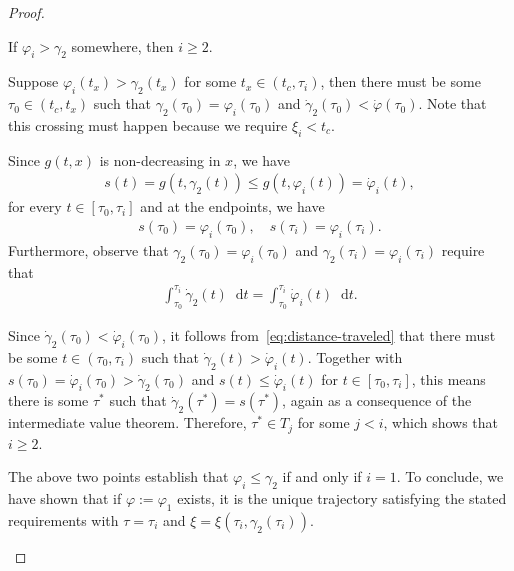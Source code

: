 \documentclass[a4paper]{article}
\theoremstyle{definition}
\theoremstyle{plain}
\newcommand*\diff{\mathop{}\!\mathrm{d}}
\begin{document}
\begin{proof}
\begin{outline}
  \1 If $\varphi_{i} > \gamma_{2}$ somewhere, then $i \geq 2$.

  \2 Suppose $\varphi_{i}(t_{x}) > \gamma_{2}(t_{x})$ for some
  $t_{x} \in (t_{c}, \tau_{i})$, then there must be some
  $\tau_{0} \in (t_{c}, t_{x})$ such that
  $\gamma_{2}(\tau_{0}) = \varphi_{i}(\tau_{0})$ and
  $\dot{\gamma}_{2}(\tau_{0}) < \dot{\varphi}(\tau_{0})$. Note that this
  crossing must happen because we require $\xi_{i} < t_{c}$.

  \2 Since $g(t, x)$ is non-decreasing in $x$, we have
  \begin{align}
    s(t) = g(t, \gamma_{2}(t)) \leq g(t, \varphi_{i}(t)) = \dot{\varphi}_{i}(t) ,
  \end{align}
  for every $t \in [\tau_{0}, \tau_{i}]$ and at the endpoints, we have
  \begin{align}
    s(\tau_{0}) = \varphi_{i}(\tau_{0}), \quad s(\tau_{i}) = \varphi_{i}(\tau_{i}) .
  \end{align}
  Furthermore, observe that $\gamma_{2}(\tau_{0}) = \varphi_{i}(\tau_{0})$ and
  $\gamma_{2}(\tau_{i}) = \varphi_{i}(\tau_{i})$ require that
  \begin{align}\label{eq:distance-traveled}
    \int_{\tau_{0}}^{\tau_{i}} \dot{\gamma}_{2}(t) \diff t  = \int_{\tau_{0}}^{\tau_{i}} \dot{\varphi}_{i}(t) \diff t .
  \end{align}

  \2 Since $\dot{\gamma}_{2}(\tau_{0}) < \dot{\varphi}_{i}(\tau_{0})$, it follows
  from~\eqref{eq:distance-traveled} that there must be some $t \in (\tau_{0}, \tau_{i})$
  such that $\dot{\gamma}_{2}(t) > \dot{\varphi}_{i}(t)$.
  Together with $s(\tau_{0}) = \dot{\varphi}_{i}(\tau_{0}) > \dot{\gamma}_{2}(\tau_{0})$
  and $s(t) \leq \dot{\varphi}_{i}(t)$ for $t \in [\tau_{0}, \tau_{i}]$, this means there is some $\tau^{*}$ such
  that $\dot{\gamma}_{2}(\tau^{*}) = s(\tau^{*})$, again as a consequence of the
  intermediate value theorem. Therefore, $\tau^{*} \in T_{j}$ for some $j < i$, which
  shows that $i \geq 2$.


  \1 The above two points establish that $\varphi_{i} \leq \gamma_{2}$ if and only if $i=1$.
  To conclude, we have shown that if $\varphi := \varphi_{1}$ exists, it is the unique
  trajectory satisfying the stated requirements with $\tau = \tau_{i}$ and
  $\xi = \xi(\tau_{i}, \gamma_{2}(\tau_{i}))$. \qedhere
\end{outline}
\end{proof}
\end{document}
